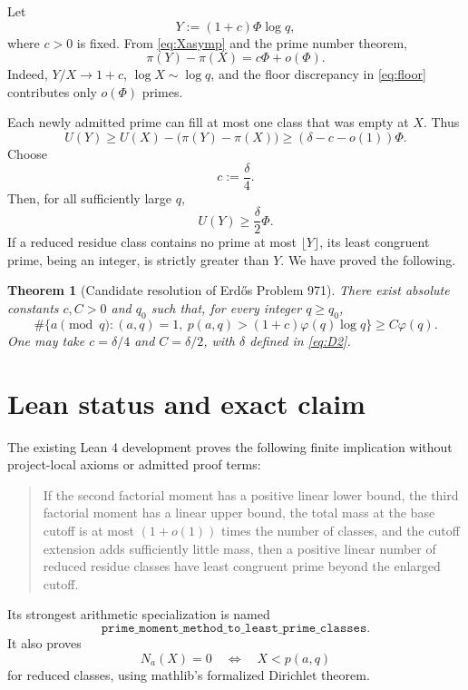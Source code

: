 \documentclass[11pt]{article}
\newtheorem{theorem}{Theorem}[section]
\theoremstyle{definition}
\theoremstyle{remark}
\newcommand{\ph}{\varphi}
\newcommand{\1}{\mathbf 1}
\begin{document}
Let
\[
 Y:=(1+c)\Phi\log q,
\]
where $c>0$ is fixed.  From \cref{eq:Xasymp} and the prime number theorem,
\begin{equation}\label{eq:increment}
 \pi(Y)-\pi(X)=c\Phi+o(\Phi).
\end{equation}
Indeed, $Y/X\to1+c$, $\log X\sim\log q$, and the floor discrepancy in \cref{eq:floor} contributes only $o(\Phi)$ primes.

Each newly admitted prime can fill at most one class that was empty at $X$.  Thus
\[
 U(Y)\ge U(X)-\bigl(\pi(Y)-\pi(X)\bigr)
 \ge(\delta-c-o(1))\Phi.
\]
Choose
\[
 c:=\frac\delta4.
\]
Then, for all sufficiently large $q$,
\begin{equation}\label{eq:UY}
 U(Y)\ge\frac\delta2\Phi.
\end{equation}
If a reduced residue class contains no prime at most $\lfloor Y\rfloor$, its least congruent prime, being an integer, is strictly greater than $Y$.  We have proved the following.

\begin{theorem}[Candidate resolution of Erd\H{o}s Problem 971]\label{thm:main}
There exist absolute constants $c,C>0$ and $q_0$ such that, for every integer $q\ge q_0$,
\[
 \#\{a\pmod q:(a,q)=1,\ p(a,q)>(1+c)\ph(q)\log q\}
 \ge C\ph(q).
\]
One may take $c=\delta/4$ and $C=\delta/2$, with $\delta$ defined in \cref{eq:D2}.
\end{theorem}

\section*{Lean status and exact claim}

The existing Lean 4 development proves the following finite implication without project-local axioms or admitted proof terms:

\begin{quote}
If the second factorial moment has a positive linear lower bound, the third factorial moment has a linear upper bound, the total mass at the base cutoff is at most $(1+o(1))$ times the number of classes, and the cutoff extension adds sufficiently little mass, then a positive linear number of reduced residue classes have least congruent prime beyond the enlarged cutoff.
\end{quote}

Its strongest arithmetic specialization is named
\[
 \texttt{prime\_moment\_method\_to\_least\_prime\_classes}.
\]
It also proves
\[
 N_a(X)=0\quad\Longleftrightarrow\quad X<p(a,q)
\]
for reduced classes, using mathlib's formalized Dirichlet theorem.
\end{document}
